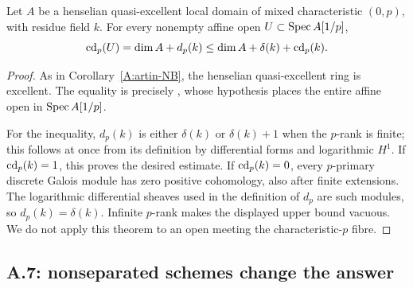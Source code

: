 \begin{proposition}
\label{A:wild-generic-open}
Let $A$ be a henselian quasi-excellent local domain of mixed characteristic $(0,p)$, with residue field $k$. For every nonempty affine open $U\subset\operatorname{Spec} A[1/p]$,
\[
\operatorname{cd}_p(U)=\dim A+d_p(k)
\leq\dim A+\delta(k)+\operatorname{cd}_p(k).
\]
\end{proposition}
\begin{proof}
As in Corollary~\ref{A:artin-NB}, the henselian quasi-excellent ring is excellent. The equality is precisely \citet[Théorème 6.1]{A_GO2008}, whose hypothesis places the entire affine open in $\operatorname{Spec} A[1/p]$.

For the inequality, $d_p(k)$ is either $\delta(k)$ or $\delta(k)+1$ when the $p$-rank is finite; this follows at once from its definition by differential forms and logarithmic $H^1$. If $\operatorname{cd}_p(k)=1$, this proves the desired estimate. If $\operatorname{cd}_p(k)=0$, every $p$-primary discrete Galois module has zero positive cohomology, also after finite extensions. The logarithmic differential sheaves used in the definition of $d_p$ are such modules, so $d_p(k)=\delta(k)$. Infinite $p$-rank makes the displayed upper bound vacuous. We do not apply this theorem to an open meeting the characteristic-$p$ fibre.
\end{proof}



\subsection{A.7: nonseparated schemes change the answer}

